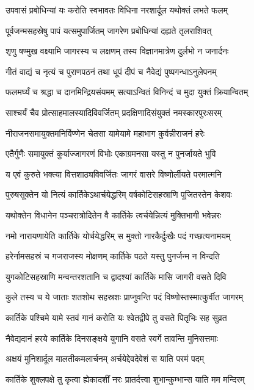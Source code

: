 \twolineshloka
{उपवासं प्रबोधिन्यां यः करोति स्वभावतः}
{विधिना नरशार्दूल यथोक्तं लभते फलम्} %

\twolineshloka
{पूर्वजन्मसहस्रेषु पापं यत्समुपार्जितम्}
{जागरेण प्रबोधिन्यां दह्यते तृलराशिवत्} %

\twolineshloka
{शृणु षण्मुख वक्ष्यामि जागरस्य च लक्षणम्}
{तस्य विज्ञानमात्रेण दुर्लभो न जनार्दनः} %

\twolineshloka
{गीतं वाद्यं च नृत्यं च पुराणपठनं तथा}
{धूपं दीपं च नैवेद्यं पुष्पगन्धाऽनुलेपनम्} %

\twolineshloka
{फलमर्घ्यं च श्रद्धा च दानमिन्द्रियसंयमम्}
{सत्याऽन्वितं विनिन्दं च मुदा युक्तं क्रियान्वितम्} %

\twolineshloka
{साश्चर्यं चैव प्रोत्साहमालस्यादिविवर्जितम्}
{प्रदक्षिणादिसंयुक्तं नमस्कारपुरःसरम्} %

\twolineshloka
{नीराजनसमायुक्तमनिर्विण्णेन चेतसा}
{यामेयामे महाभाग कुर्वन्नीराजनं हरेः} %

\twolineshloka
{एतैर्गुणैः समायुक्तं कुर्याज्जागरणं विभोः}
{एकाग्रमनसा यस्तु न पुनर्जायते भुवि} %

\twolineshloka
{य एवं कुरुते भक्त्या वित्तशाठ्यविवर्जितः}
{जागरं वासरे विष्णोर्लीयते परमात्मनि} %

\twolineshloka
{पुरुषसूक्तेन यो नित्यं कार्तिकेऽथार्चयेद्धरिम्}
{वर्षकोटिसहस्राणि पूजितस्तेन केशवः} %

\twolineshloka
{यथोक्तेन विधानेन पञ्चरात्रोदितेन वै}
{कार्तिके त्वर्चयेन्नित्यं मुक्तिभागी भवेन्नरः} %

\twolineshloka
{नमो नारायणायेति कार्तिके योर्चयेद्धरिम्}
{स मुक्तो नारकैर्दुःखैः पदं गच्छत्यनामयम्} %

\twolineshloka
{हरेर्नामसहस्रं च गजराजस्य मोक्षणम्}
{कार्तिके पठते यस्तु पुनर्जन्म न विन्दति} %

\twolineshloka
{युगकोटिसहस्राणि मन्वन्तरशतानि च}
{द्वादश्यां कार्तिके मासि जागरी वसते दिवि} %

\twolineshloka
{कुले तस्य च ये जाताः शतशोथ सहस्रशः}
{प्राप्नुवन्ति पदं विष्णोस्तस्मात्कुर्वीत जागरम्} %

\twolineshloka
{कार्तिके पश्चिमे यामे स्तवं गानं करोति यः}
{श्वेतद्वीपे तु वसते पितृभिः सह सुव्रत} %

\twolineshloka
{नैवेद्यदानं हरये कार्तिके दिनसङ्क्षये}
{युगानि वसते स्वर्गे तावन्ति मुनिसत्तमाः} %

\twolineshloka
{अक्षयं मुनिशार्दूल मालतीकमलार्चनम्}
{अर्चयेद्देवदेवेशं स याति परमं पदम्} %

\twolineshloka
{कार्तिके शुक्लपक्षे तु कृत्वा ह्येकादशीं नरः}
{प्रातर्दत्त्वा शुभान्कुम्भान्स याति मम मन्दिरम्} %

